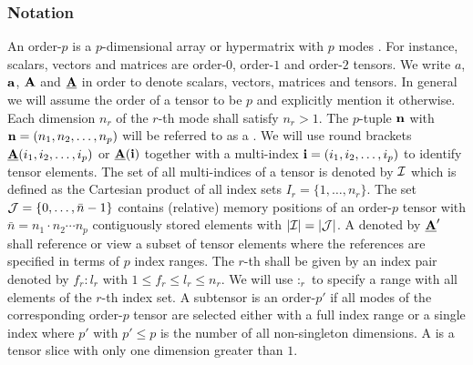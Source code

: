 \subsubsection{Notation}
An order-$p$  is a $p$-dimensional array or hypermatrix with $p$ modes \cite{lim:2017:hypermatrices}.
For instance, scalars, vectors and matrices are order-$0$, order-$1$ and order-$2$ tensors.
We write $a$, $\mathbf{a}$, $\mathbf{A}$ and $\underline{\mathbf{A}}$ in order to denote scalars, vectors, matrices and tensors. %
In general we will assume the order of a tensor to be $p$ and explicitly mention it otherwise.
Each dimension $n_r$ of the $r$-th mode shall satisfy $n_r>1$.
The $p$-tuple $\mathbf{n}$ with $\mathbf{n} = (n_1,n_2,\dots,n_p)$ will be referred to as a .
We will use round brackets $\underline{\mathbf{A}}(i_1,i_2,\dots,i_p)$ or $\underline{\mathbf{A}}(\mathbf{i})$ together with a multi-index $\mathbf{i} = (i_1,i_2,\dots,i_p)$ to identify tensor elements.
The set of all multi-indices of a tensor is denoted by $\mathcal{I}$ which is defined as the Cartesian product of all index sets $I_r = \{1,\dots,n_r\}$.
The set $\mathcal{J} = \{0,\dots,\bar{n}-1\}$ contains (relative) memory positions of an order-$p$ tensor with $\bar{n} = n_1 \cdot n_2 \cdots n_p$ contiguously stored elements with $|\mathcal{I}| = |\mathcal{J}|$.
A  denoted by $\underline{\mathbf{A}}'$ shall reference or view a subset of tensor elements where the references are specified in terms of $p$ index ranges.
The $r$-th   shall be given by an index pair denoted by $f_r \colon l_r$ with $1 \leq f_r \leq l_r \leq n_r$.
We will use $\colon_r$ to specify a range with all elements of the $r$-th index set.
A subtensor is an order-$p'$  if all modes of the corresponding order-$p$ tensor are selected either with a full index range or a single index where $p'$ with $p'\leq p$ is the number of all non-singleton dimensions.
A  is a tensor slice with only one dimension greater than $1$. 


